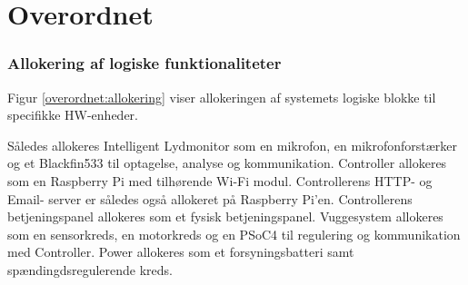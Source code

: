 \chapter{Overordnet}




%
%




\subsection{Allokering af logiske funktionaliteter}
Figur \ref{overordnet:allokering} viser allokeringen af systemets logiske blokke til specifikke HW-enheder.

Således allokeres Intelligent Lydmonitor som en mikrofon, en mikrofonforstærker og et Blackfin533 til optagelse, analyse og kommunikation.
Controller allokeres som en Raspberry Pi med tilhørende Wi-Fi modul. Controllerens HTTP- og Email- server er således også allokeret på Raspberry Pi'en. Controllerens betjeningspanel allokeres som et fysisk betjeningspanel.
Vuggesystem allokeres som en sensorkreds, en motorkreds og en PSoC4 til regulering og kommunikation med Controller.
Power allokeres som et forsyningsbatteri samt spændingdsregulerende kreds.


